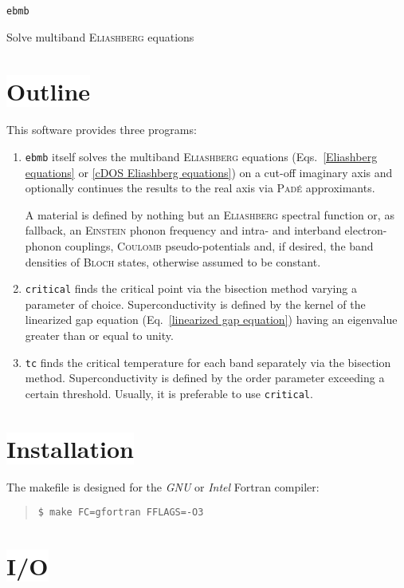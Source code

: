 \documentclass[a4paper]{article}
\newlength\gap
\def\headline#1{\section*{%
   \normalsize\normalfont%
   \rlap{\rule[0.5ex]\textwidth{0.4pt}}%
   \qquad\colorbox{white}{#1}%
   }}
\begin{document}
   \begin{center}
      \LARGE \texttt{ebmb} \par \bigskip
      \large Solve multiband \textsc{Eliashberg} equations
   \end{center}

   \headline{Outline}

   This software provides three programs:
   \begin{enumerate}
      \item
         \texttt{ebmb} itself solves the multiband \textsc{Eliashberg} equations
         (Eqs.~\ref{Eliashberg equations} or \ref{cDOS Eliashberg equations}) on
         a cut-off imaginary axis and optionally continues the results to the
         real axis via \textsc{Padé} approximants.

         A material is defined by nothing but an \textsc{Eliashberg} spectral
         function or, as fallback, an \textsc{Einstein} phonon frequency and
         intra- and interband electron-phonon couplings, \textsc{Coulomb}
         pseudo-potentials and, if desired, the band densities of \textsc{Bloch}
         states, otherwise assumed to be constant.

      \item
         \texttt{critical} finds the critical point via the bisection method
         varying a parameter of choice. Superconductivity is defined by the
         kernel of the linearized gap equation (Eq.~\ref{linearized gap
         equation}) having an eigenvalue greater than or equal to unity.

      \item
         \texttt{tc} finds the critical temperature for each band separately via
         the bisection method. Superconductivity is defined by the order
         parameter exceeding a certain threshold. Usually, it is preferable to
         use \texttt{critical}.

   \end{enumerate}

   \headline{Installation}

   The makefile is designed for the \emph{GNU} or \emph{Intel} Fortran compiler:
   \begin{quote}
      \verb|$ make FC=gfortran FFLAGS=-O3|
   \end{quote}

   \headline{I/O}
\end{document}
